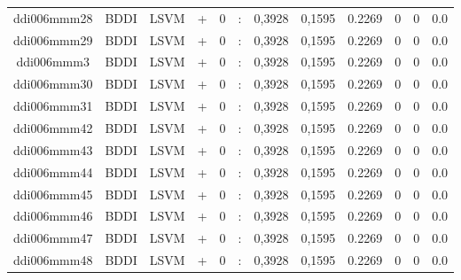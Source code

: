 \documentclass[a4paper]{article}
\begin{document}
\begin{landscape}
\begin{center}
\begin{tabular}{ |c|c|c|c|c|c|c|c|c|c|c|c|}
 
 	
 	\small{ ddi006mmm28 } & BDDI & LSVM & +  &  0 &  :  &  0,3928 & 0,1595 & 0.2269  &  0 & 0 & 0.0 \\
 	

 
 	
 	\small{ ddi006mmm29 } & BDDI & LSVM & +  &  0 &  :  &  0,3928 & 0,1595 & 0.2269  &  0 & 0 & 0.0 \\
 	

 
 	
 	\small{ ddi006mmm3 } & BDDI & LSVM & +  &  0 &  :  &  0,3928 & 0,1595 & 0.2269  &  0 & 0 & 0.0 \\
 	

 
 	
 	\small{ ddi006mmm30 } & BDDI & LSVM & +  &  0 &  :  &  0,3928 & 0,1595 & 0.2269  &  0 & 0 & 0.0 \\
 	

 
 	
 	\small{ ddi006mmm31 } & BDDI & LSVM & +  &  0 &  :  &  0,3928 & 0,1595 & 0.2269  &  0 & 0 & 0.0 \\
 	

 
 	
 	\small{ ddi006mmm42 } & BDDI & LSVM & +  &  0 &  :  &  0,3928 & 0,1595 & 0.2269  &  0 & 0 & 0.0 \\
 	

 
 	
 	\small{ ddi006mmm43 } & BDDI & LSVM & +  &  0 &  :  &  0,3928 & 0,1595 & 0.2269  &  0 & 0 & 0.0 \\
 	

 
 	
 	\small{ ddi006mmm44 } & BDDI & LSVM & +  &  0 &  :  &  0,3928 & 0,1595 & 0.2269  &  0 & 0 & 0.0 \\
 	

 
 	
 	\small{ ddi006mmm45 } & BDDI & LSVM & +  &  0 &  :  &  0,3928 & 0,1595 & 0.2269  &  0 & 0 & 0.0 \\
 	

 
 	
 	\small{ ddi006mmm46 } & BDDI & LSVM & +  &  0 &  :  &  0,3928 & 0,1595 & 0.2269  &  0 & 0 & 0.0 \\
 	

 
 	
 	\small{ ddi006mmm47 } & BDDI & LSVM & +  &  0 &  :  &  0,3928 & 0,1595 & 0.2269  &  0 & 0 & 0.0 \\
 	

 
 	
 	\small{ ddi006mmm48 } & BDDI & LSVM & +  &  0 &  :  &  0,3928 & 0,1595 & 0.2269  &  0 & 0 & 0.0 \\
 	


\end{tabular}
\end{center}
\end{landscape}
\end{document}
